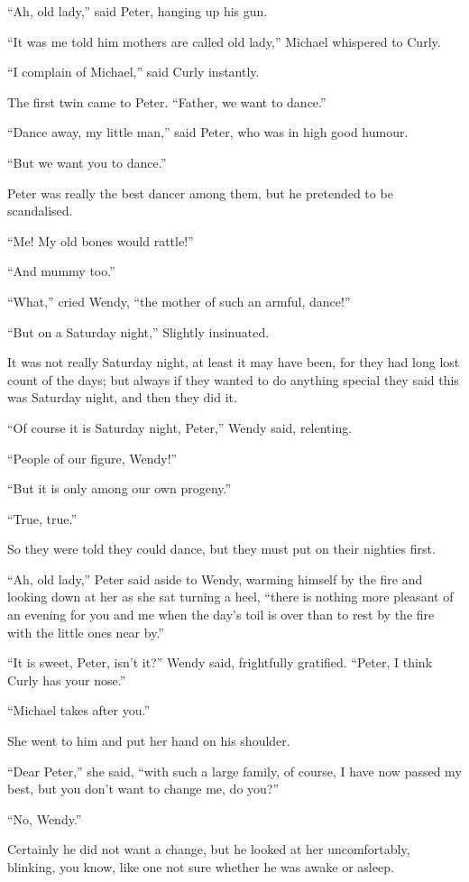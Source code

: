 “Ah, old lady,” said Peter, hanging up his gun.

“It was me told him mothers are called old lady,” Michael whispered to Curly.

“I complain of Michael,” said Curly instantly.

The first twin came to Peter.
“Father, we want to dance.”

“Dance away, my little man,” said Peter, who was in high good humour.

“But we want you to dance.”

Peter was really the best dancer among them, but he pretended to be scandalised.

“Me!
My old bones would rattle!”

“And mummy too.”

“What,” cried Wendy, “the mother of such an armful, dance!”

“But on a Saturday night,” Slightly insinuated.

It was not really Saturday night,
at least it may have been, for they had long lost count of the days;
but always if they wanted to do anything special they said this was Saturday night,
and then they did it.

“Of course it is Saturday night, Peter,” Wendy said, relenting.

“People of our figure, Wendy!”

“But it is only among our own progeny.”

“True, true.”

So they were told they could dance,
but they must put on their nighties first.

“Ah, old lady,” Peter said aside to Wendy,
warming himself by the fire and looking down at her as she sat turning a heel,
“there is nothing more pleasant of an evening for you and me when the day’s toil is over
than to rest by the fire with the little ones near by.”

“It is sweet, Peter, isn’t it?\@” Wendy said, frightfully gratified.
“Peter, I think Curly has your nose.”

“Michael takes after you.”

She went to him and put her hand on his shoulder.

“Dear Peter,” she said,
“with such a large family, of course, I have now passed my best,
but you don’t want to change me, do you?”

“No, Wendy.”

Certainly he did not want a change,
but he looked at her uncomfortably, blinking,
you know, like one not sure whether he was awake or asleep.

